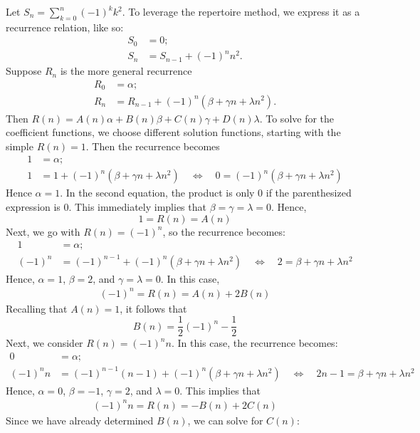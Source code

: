 \documentclass[12pt]{article}
\newenvironment{sol}[1][Solution]{\begin{trivlist}
		\item[\hskip \labelsep {\bfseries #1:}]}{\end{trivlist}}
\begin{document}
\begin{sol}
	Let $S_n=\sum_{k=0}^{n}(-1)^kk^2$. To leverage the repertoire method, we express it
	as a recurrence relation, like so:
	\begin{align*}
		S_0&=0;\\
		S_n&=S_{n-1}+(-1)^nn^2.
	\end{align*}
	Suppose $R_n$ is the more general recurrence
	\begin{align*}
		R_0&=\alpha;\\
		R_n&=R_{n-1}+(-1)^n\left(\beta+\gamma n+\lambda n^2\right).
	\end{align*}
	Then $R(n)=A(n)\alpha + B(n)\beta + C(n)\gamma + D(n)\lambda$. To solve for the coefficient
	functions, we choose different solution functions, starting with the simple $R(n)=1$.
	Then the recurrence becomes
	\begin{align*}
		1&=\alpha;\\
		1&=1 + (-1)^n(\beta+\gamma n +\lambda n^2)\quad\iff \quad
		0=(-1)^n(\beta+\gamma n + \lambda n^2)
	\end{align*}
	Hence $\alpha =1 $. In the second equation, the product is only 0 if the parenthesized expression
	is $0$. This immediately implies that $\beta=\gamma=\lambda=0$.  Hence,
	\[
	1=R(n)=A(n)
	\]
	Next, we go with  $R(n)=(-1)^n$,
	so the recurrence becomes:
	\begin{align*}
		1&=\alpha;\\
		(-1)^n&=(-1)^{n-1}+(-1)^n(\beta+\gamma n + \lambda n^2)
		\quad\iff\quad
		2=\beta + \gamma n + \lambda n^2
	\end{align*}
	Hence, $\alpha=1$, $\beta=2$, and $\gamma=\lambda=0$. In this case,
	\begin{align*}
		(-1)^n=R(n)=A(n)+2B(n)
	\end{align*}
	Recalling that $A(n)=1$, it follows that
	\[
	B(n)=\frac{1}{2}(-1)^n-\frac{1}{2}
	\]
	Next, we consider $R(n)=(-1)^nn$. In this case, the recurrence becomes:
	\begin{align*}
		0&=\alpha;\\
		(-1)^nn&=(-1)^{n-1}(n-1)+(-1)^n(\beta + \gamma n + \lambda n^2)
		\quad\iff\quad
		2n-1=\beta + \gamma n + \lambda n^2
	\end{align*}
	Hence, $\alpha=0$, $\beta=-1$, $\gamma=2$, and $\lambda= 0$. This implies that
	\begin{align*}
		(-1)^nn=R(n)=-B(n)+2C(n)
	\end{align*}
	Since we have already determined $B(n)$, we can solve for $C(n)$:
	\begin{align*}

\end{align*}
\end{sol}
\end{document}
